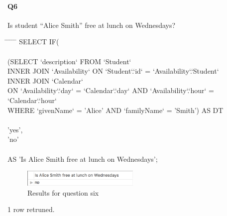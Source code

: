 \documentclass[paper=a4, fontsize=11pt]{scrartcl} %
\numberwithin{equation}{section} %
\numberwithin{figure}{section} %
\numberwithin{table}{section} %
\begin{document}
    \paragraph{Q6} Is student “Alice Smith” free at lunch on Wednesdays?
    \begin{center}
        \begin{minipage}{10cm}
        \begin{tabbing}
            \hspace*{.25in} \= \hspace*{.25in} \= \hspace*{.25in} \= \hspace*{.25in} \= \hspace*{.25in} \=\kill
            {\color{blue}SELECT IF(}\\
            \\
            \>\> {\color{blue}(SELECT `description` 
            FROM `Student`   } \\
            \>\>\> {\color{blue}INNER JOIN `Availability` ON `Student`.`id` = `Availability`.`Student`}\\
            \>\>\> {\color{blue}INNER JOIN `Calendar` }\\
            \>\>\> {\color{blue} ON `Availability`.`day` = `Calendar`.`day` AND `Availability`.`hour` = `Calendar`.`hour` }\\
            \>\>\> {\color{blue} WHERE `givenName` = 'Alice' AND `familyName` = 'Smith') AS DT}\\
            \>\>\\
            \>\> {\color{blue} 'yes', }\\
            \>\> {\color{blue} 'no'}\\
            \>{\color{blue})}\\
            \> {\color{blue} AS 'Is Alice Smith free at lunch on Wednesdays';}\\
        
        \end{tabbing}
        \end{minipage}
    \end{center}
    \begin{figure}[htbp!]
        \centering
        \includegraphics[width=0.5\textwidth]{q61.png}
        \caption{Results for question six}%
        \vspace{-1em}
    \end{figure}
    {\color{red} 1 row retruned.}
\end{document}
